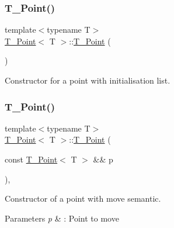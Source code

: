 \mbox{\label{classT__Point_a61017b12d3c2aa88a242dbbc57733413}} 
\subsubsection{\texorpdfstring{T\+\_\+\+Point()}{T\_Point()}\hspace{0.1cm}{\footnotesize\ttfamily [2/4]}}
{\footnotesize\ttfamily template$<$typename T$>$ \\
\hyperlink{classT__Point}{T\+\_\+\+Point}$<$ T $>$\+::\hyperlink{classT__Point}{T\+\_\+\+Point} (\begin{DoxyParamCaption}{ }\end{DoxyParamCaption})\hspace{0.3cm}{\ttfamily [inline]}}



Constructor for a point with initialisation list. 

\mbox{\label{classT__Point_af6c471d7e5547576a6c379930b9d1d35}} 
\subsubsection{\texorpdfstring{T\+\_\+\+Point()}{T\_Point()}\hspace{0.1cm}{\footnotesize\ttfamily [3/4]}}
{\footnotesize\ttfamily template$<$typename T$>$ \\
\hyperlink{classT__Point}{T\+\_\+\+Point}$<$ T $>$\+::\hyperlink{classT__Point}{T\+\_\+\+Point} (\begin{DoxyParamCaption}\item[{const \hyperlink{classT__Point}{T\+\_\+\+Point}$<$ T $>$ \&\&}]{p }\end{DoxyParamCaption})\hspace{0.3cm}{\ttfamily [inline]}, {\ttfamily [noexcept]}}



Constructor of a point with move semantic. 


\begin{DoxyParams}{Parameters}
{\em p} & \+: Point to move \\
\hline
\end{DoxyParams}
\mbox{\label{classT__Point_a12f2ef3c5f10e162dcb6385bbfbfae58}} 
